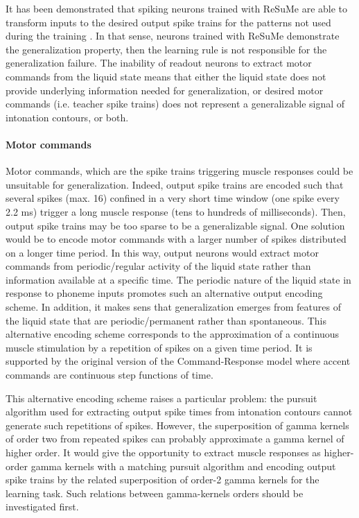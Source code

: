 \documentclass[11pt, a4paper]{article} %
\begin{document}
It has been demonstrated that spiking neurons trained with ReSuMe are able to transform inputs to the desired output spike trains for the patterns not used during the training \cite{ponulak2006generalization}. In that sense, neurons trained with ReSuMe demonstrate the generalization property, then the learning rule is not responsible for the generalization failure. The inability of readout neurons to extract motor commands from the liquid state means that either the liquid state does not provide underlying information needed for generalization, or desired motor commands (i.e. teacher spike trains) does not represent a generalizable signal of intonation contours, or both.

\paragraph{Motor commands}
Motor commands, which are the spike trains triggering muscle responses could be unsuitable for generalization. Indeed, output spike trains are encoded such that several spikes (max. 16) confined in a very short time window (one spike every 2.2 ms) trigger a long muscle response (tens to hundreds of milliseconds). Then, output spike trains may be too sparse to be a generalizable signal. One solution would be to encode motor commands with a larger number of spikes distributed on a longer time period. In this way, output neurons would extract motor commands from periodic/regular activity of the liquid state rather than information available at a specific time. The periodic nature of the liquid state in response to phoneme inputs promotes such an alternative output encoding scheme. In addition, it makes sens that generalization emerges from features of the liquid state that are periodic/permanent rather than spontaneous. This alternative encoding scheme corresponds to the approximation of a continuous muscle stimulation by a repetition of spikes on a given time period. It is supported by the original version of the Command-Response model \cite{ohno1998effects} where accent commands are continuous step functions of time.

This alternative encoding scheme raises a particular problem: the pursuit algorithm used for extracting output spike times from intonation contours cannot generate such repetitions of spikes. However, the superposition of gamma kernels of order two from repeated spikes can probably approximate a gamma kernel of higher order. It would give the opportunity to extract muscle responses as higher-order gamma kernels with a matching pursuit algorithm and encoding output spike trains by the related superposition of order-2 gamma kernels for the learning task. Such relations between gamma-kernels orders should be investigated first.
\end{document}

